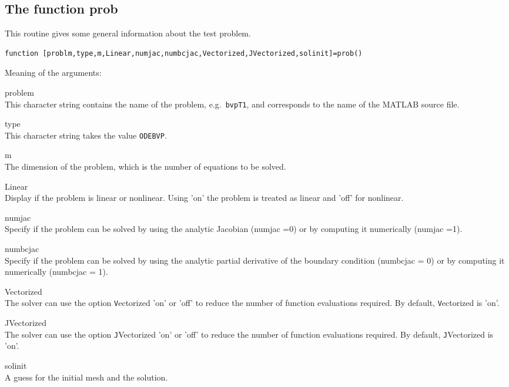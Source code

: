\documentclass[<options>]{article}
\begin{document}
\subsection{The function prob}\label{prob}
This routine gives some general information about the test
problem.
\begin{verbatim}
function [problm,type,m,Linear,numjac,numbcjac,Vectorized,JVectorized,solinit]=prob()
\end{verbatim}
Meaning of the arguments:
\begin{list}
{}{%
  \renewcommand\makelabel[1]{\texttt{#1}\hfill}
}
\item[problem]\ \\
This character string contains the name of the problem, e.g.\ \texttt{bvpT1}, and
corresponds to the name of the MATLAB source file.
\item[type]\ \\
This character string takes the value \texttt{ODEBVP}.
\item[m]\ \\
The dimension of the problem, which is the number of equations to be solved.
\item[Linear]\ \\
Display if the problem is linear or nonlinear. Using 'on' the problem is treated as linear and 'off' for nonlinear.
\item[numjac]\ \\
Specify if the problem can be solved by using the analytic Jacobian (numjac =0)  or by computing it numerically (numjac =1).
\item[numbcjac]\ \\
Specify if the problem can be solved by using the analytic partial derivative of the boundary condition (numbcjac = 0) or by computing it
numerically (numbcjac = 1).
\item[Vectorized]\ \\
The solver can use the option  \texttt Vectorized  'on' or 'off' to reduce the number of function evaluations required.
By default,  \texttt Vectorized  is 'on'.
\item[JVectorized]\ \\
The solver can use the option  \texttt JVectorized  'on' or 'off' to reduce the number of function evaluations required.
By default,  \texttt JVectorized  is 'on'.
\item[solinit]\ \\
A guess for the initial mesh and the solution.
\end{list}
\end{document}
